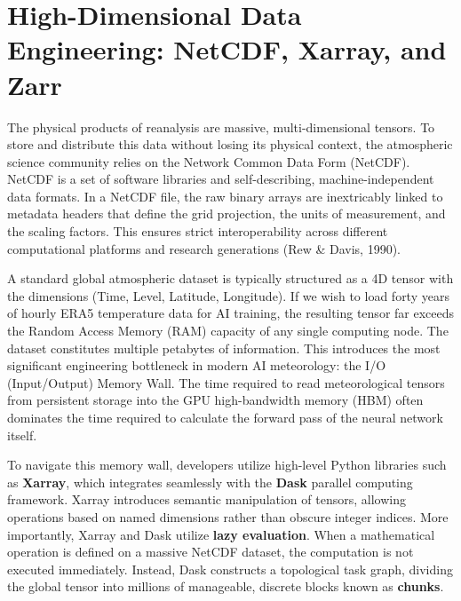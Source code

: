 \section{High-Dimensional Data Engineering: NetCDF, Xarray, and Zarr}

The physical products of reanalysis are massive, multi-dimensional tensors. To store and distribute this data without losing its physical context, the atmospheric science community relies on the Network Common Data Form (NetCDF). NetCDF is a set of software libraries and self-describing, machine-independent data formats. In a NetCDF file, the raw binary arrays are inextricably linked to metadata headers that define the grid projection, the units of measurement, and the scaling factors. This ensures strict interoperability across different computational platforms and research generations (Rew \& Davis, 1990).

A standard global atmospheric dataset is typically structured as a 4D tensor with the dimensions (Time, Level, Latitude, Longitude). If we wish to load forty years of hourly ERA5 temperature data for AI training, the resulting tensor far exceeds the Random Access Memory (RAM) capacity of any single computing node. The dataset constitutes multiple petabytes of information. This introduces the most significant engineering bottleneck in modern AI meteorology: the I/O (Input/Output) Memory Wall. The time required to read meteorological tensors from persistent storage into the GPU high-bandwidth memory (HBM) often dominates the time required to calculate the forward pass of the neural network itself.

To navigate this memory wall, developers utilize high-level Python libraries such as \textbf{Xarray}, which integrates seamlessly with the \textbf{Dask} parallel computing framework. Xarray introduces semantic manipulation of tensors, allowing operations based on named dimensions rather than obscure integer indices. More importantly, Xarray and Dask utilize \textbf{lazy evaluation}. When a mathematical operation is defined on a massive NetCDF dataset, the computation is not executed immediately. Instead, Dask constructs a topological task graph, dividing the global tensor into millions of manageable, discrete blocks known as \textbf{chunks}.

